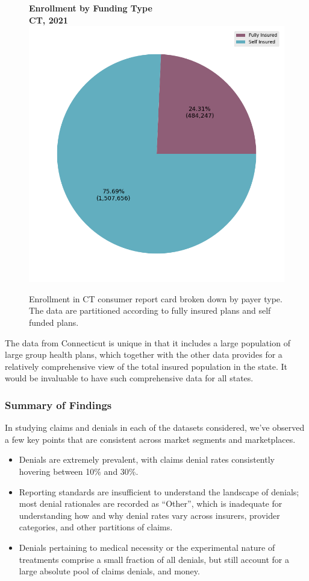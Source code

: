 \documentclass[12pt, a4paper,twoside,parskip=full]{report}
\theoremstyle{plain} %
\theoremstyle{definition} %
\theoremstyle{remark} %
\numberwithin{equation}{chapter}
\begin{document}
		\begin{figure}[h!]
			\centering
			\textbf{Enrollment by Funding Type}\\
			\textbf{CT, 2021}\\
			\includegraphics[width=.5\columnwidth]{images/ct_claims/enrollment_by_payer_type.png}
			\caption{Enrollment in CT consumer report card broken down by payer type. The data are partitioned according to fully insured plans and self funded plans.}
			\label{ctenrollmentbyfundingtype}
		\end{figure}
	
		\clearpage
	
		The data from Connecticut is unique in that it includes a large population of large group health plans, which together with the other data provides for a relatively comprehensive view of the total insured population in the state. It would be invaluable to have such comprehensive data for all states.
		
		\subsubsection{Summary of Findings}
		
		In studying claims and denials in each of the datasets considered, we've observed a few key points
		that are consistent across market segments and marketplaces. 
		
		\begin{itemize}
			\item Denials are extremely prevalent, with claims denial rates consistently hovering between 10\% and 30\%.
			\item Reporting standards are insufficient to understand the landscape of denials; most denial rationales are recorded
			as ``Other'', which is inadequate for understanding how and why denial rates vary across insurers, provider categories,
			and other partitions of claims.
			\item Denials pertaining to medical necessity or the experimental nature of treatments comprise a small fraction of
			all denials, but still account for a large absolute pool of claims denials, and money.
		\end{itemize}
		
\end{document}
